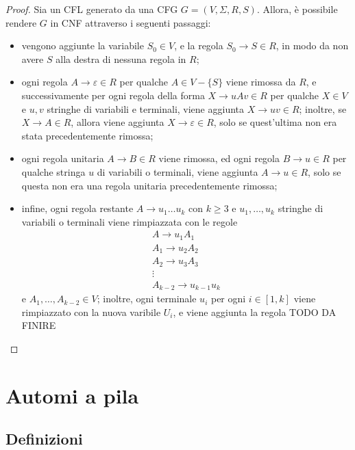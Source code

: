 \documentclass[a4paper, 12pt]{report}
\begin{document}
    \begin{proof}
        Sia un CFL generato da una CFG $G = (V, \Sigma, R, S)$. Allora, è possibile rendere $G$ in CNF attraverso i seguenti passaggi:

        \begin{itemize}
            \item vengono aggiunte la variabile $S_0 \in V$, e la regola $S_0 \to S \in R$, in modo da non avere $S$ alla destra di nessuna regola in $R$;
            \item ogni regola $A \to \varepsilon \in R$ per qualche $A \in V - \{S\}$ viene rimossa da $R$, e successivamente per ogni regola della forma $X \to uAv \in R$ per qualche $X \in V$ e $u, v$ stringhe di variabili e terminali, viene aggiunta $X \to uv \in R$; inoltre, se $X \to A \in R$, allora viene aggiunta $X \to \varepsilon \in R$, solo se quest'ultima non era stata precedentemente rimossa;
            \item ogni regola unitaria $A \to B \in R$ viene rimossa, ed ogni regola $B \to u \in R$ per qualche stringa $u$ di variabili o terminali, viene aggiunta $A \to u \in R$, solo se questa non era una regola unitaria precedentemente rimossa;
            \item infine, ogni regola restante $A \to u_1 \ldots u_k$ con $k \ge 3$ e $u_1, \ldots, u_k$ stringhe di variabili o terminali viene rimpiazzata con le regole $$\left . \begin{array}{c} A \to u_1 A_1  \\ A_1 \to u_2 A_2 \\ A_2 \to u_3 A_3 \\ \vdots \\ A_{k - 2} \to u_{k - 1}u_k \end{array} \right .$$ e $A_1, \ldots, A_{k - 2} \in V$; inoltre, ogni terminale $u_i$ per ogni $i \in [1, k]$ viene rimpiazzato con la nuova varibile $U_i$, e viene aggiunta la regola TODO DA FINIRE
        \end{itemize}

    \end{proof}

    \section{Automi a pila}

    \subsection{Definizioni}
\end{document}
